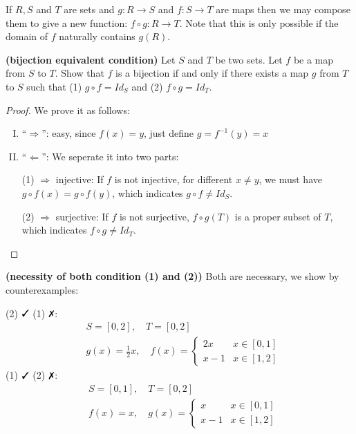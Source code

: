 \documentclass{article}
\newcommand{\bfs}[1]{\textbf{({#1}) }}
\newcommand{\cmark}{\text{\ding{51}}}
\newcommand{\xmark}{\text{\ding{55}}}
\begin{document}
\begin{rema}
 If $R, S$ and $T$ are sets and $g: R \rightarrow S$ and $f: S \rightarrow T$ are maps then we may compose them to give a new function: $f \circ g: R \rightarrow T$. Note that this is only possible if the domain of $f$ naturally contains $g(R)$.
\end{rema}
\begin{lema}{\bfs{bijection equivalent condition}}\label{lem:oqneqdd}
Let $S$ and $T$ be two sets. Let $f$ be a map from $S$ to $T$. Show that $f$ is a bijection if and only if there exists a map $g$ from $T$ to $S$ such that (1) $g \circ f = Id_S$ and (2) $f \circ g = Id_T$.
\end{lema}
\begin{proof}We prove it as follows:
\begin{enumerate}[I)]
    \item ``$\Rightarrow$'': easy, since  $f(x)=y$, just define $g=f^{-1}(y)=x$
    \item ``$\Leftarrow$'': We seperate it into two parts:
    
        (1) $\Rightarrow$ injective: If $f$ is not injective, for different $x\ne y$, we must have $g \circ f(x) =g \circ f (y)$, which indicates  $g \circ f\ne Id_S$.
        
        (2) $\Rightarrow$ surjective: If $f$ is not surjective, $f \circ g (T)$ is a proper subset of $T$, which indicates  $f \circ g\ne Id_T$.
\end{enumerate}
\end{proof}
\begin{rema}{\bfs{necessity of both condition (1) and (2)}} Both are necessary, we show by counterexamples:

(2) $\cmark$ (1) $\xmark$: 
\begin{align*}
    &S=[0,2], \quad T=[0,2] \\
&g(x)=\frac{1}{2} x,  \quad f(x)=\left\{\begin{array}{cl}
2 x & x\in [0,1] \\
x-1 &  x\in [1,2]
\end{array}\right.
\end{align*}
 (1) $\cmark$ (2) $\xmark$: 
\begin{align*}
    &S=[0,1], \quad T=[0,2] \\
&f(x)= x, \quad g(x)=\left\{\begin{array}{cl}
x & x\in [0,1] \\
x-1 &  x\in [1,2]
\end{array}\right.
\end{align*}
\end{rema}
\end{document}
